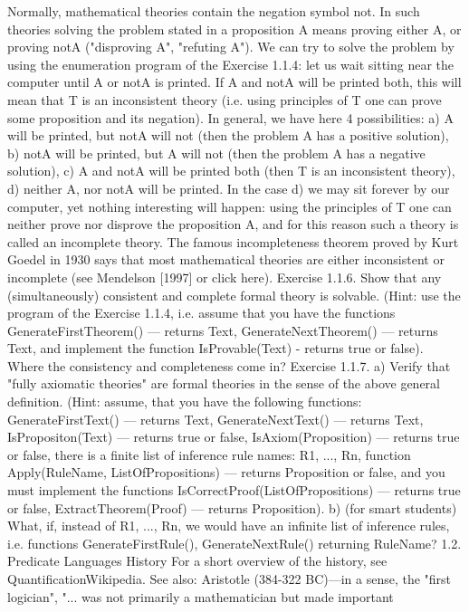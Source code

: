 Normally, mathematical theories contain the negation symbol not. In such theories solving the problem
stated in a proposition A means proving either A, or proving notA ("disproving A", "refuting A"). We can
try to solve the problem by using the enumeration program of the Exercise 1.1.4: let us wait sitting near
the computer until A or notA is printed. If A and notA will be printed both, this will mean that T is an
inconsistent theory (i.e. using principles of T one can prove some proposition and its negation). In
general, we have here 4 possibilities:
a) A will be printed, but notA will not (then the problem A has a positive solution),
b) notA will be printed, but A will not (then the problem A has a negative solution),
c) A and notA will be printed both (then T is an inconsistent theory),
d) neither A, nor notA will be printed.
In the case d) we may sit forever by our computer, yet nothing interesting will happen: using the
principles of T one can neither prove nor disprove the proposition A, and for this reason such a theory is
called an incomplete theory. The famous incompleteness theorem proved by Kurt Goedel in 1930 says
that most mathematical theories are either inconsistent or incomplete (see Mendelson [1997] or click
here).
Exercise 1.1.6. Show that any (simultaneously) consistent and complete formal theory is solvable. (Hint:
use the program of the Exercise 1.1.4, i.e. assume that you have the functions GenerateFirstTheorem() ---
returns Text, GenerateNextTheorem() --- returns Text, and implement the function IsProvable(Text) -
returns true or false). Where the consistency and completeness come in?
Exercise 1.1.7. a) Verify that "fully axiomatic theories" are formal theories in the sense of the above
general definition. (Hint: assume, that you have the following functions: GenerateFirstText() --- returns
Text, GenerateNextText() --- returns Text, IsPropositon(Text) --- returns true or false, IsAxiom(Proposition) ---
returns true or false, there is a finite list of inference rule names: {R1, ..., Rn}, function Apply(RuleName,
ListOfPropositions) --- returns Proposition or false, and you must implement the functions
IsCorrectProof(ListOfPropositions) --- returns true or false, ExtractTheorem(Proof) --- returns Proposition).
b) (for smart students) What, if, instead of {R1, ..., Rn}, we would have an infinite list of inference rules,
i.e. functions GenerateFirstRule(), GenerateNextRule() returning RuleName?
1.2. Predicate Languages
History
For a short overview of the history, see QuantificationWikipedia.
See also:
Aristotle (384-322 BC)---in a sense, the "first logician", "... was not primarily a mathematician but made important
